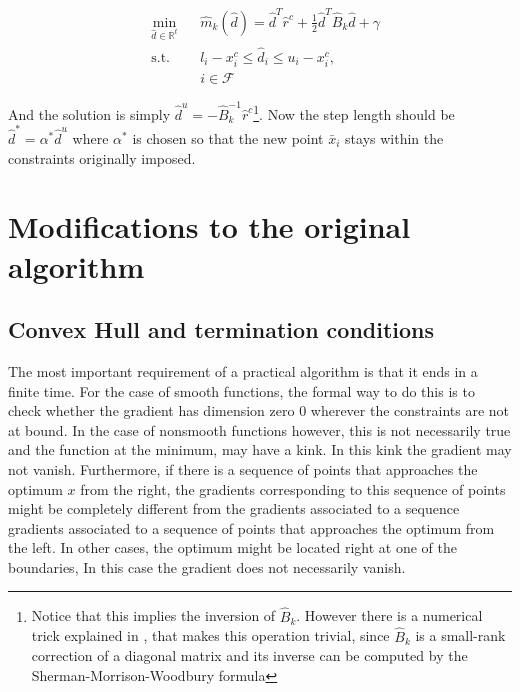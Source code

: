 \begin{equation} \label{subproblem}
  \begin{aligned}
    & \underset{\hat{d} \in \mathbb{R}^t}{\text{min}} 
    & & \hat{m}_k(\hat{d}) = \hat{d}^T\hat{r}^c + \frac{1}{2} \hat{d}^T\hat{B}_k\hat{d} + \gamma \\
    & \text{s.t.}
    & & l_i - x_i^c \leq \hat{d}_i \leq u_i - x_i^c , \; \\
    & & & i \in \mathcal{F}
  \end{aligned}
\end{equation}

And the solution is simply $\hat{d}^u = -\hat{B}_k^{-1}\hat{r}^c$\footnote{Notice that this implies the inversion of $\hat{B}_k$.  However there is a numerical trick explained in \citep{nocedal}, that makes this operation trivial, since $\hat{B}_k$ is a small-rank correction of a diagonal matrix and its inverse can be computed by the Sherman-Morrison-Woodbury formula}.  Now the step length should be $\hat{d}^* = \alpha^* \hat{d}^u$ where $\alpha^*$ is chosen so that the new point $\bar{x}_i$ stays within the constraints originally imposed.

\chapter{Modifications to the original algorithm}

\section{Convex Hull and termination conditions}

The most important requirement of a practical algorithm is that it ends in a finite time. For the case of smooth functions, the formal way to do this is to check whether the gradient has dimension zero $0$ wherever the constraints are not at bound. In the case of nonsmooth functions however, this is not necessarily true and the function at the minimum, may have a kink. In this kink the gradient may not vanish.  Furthermore, if there is a sequence of points that approaches the optimum $x$ from the right, the gradients corresponding to this sequence of points might be completely different from the gradients associated to a sequence gradients associated to a sequence of points that approaches the optimum from the left. In other cases, the optimum might be located right at one of the boundaries, In this case the gradient does not necessarily vanish.

